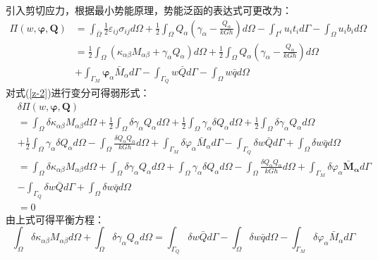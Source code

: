 引入剪切应力，根据最小势能原理，势能泛函的表达式可更改为：
\begin{equation}\label{z-2}
\begin{split} 
    \Pi(w,\boldsymbol{\varphi},\boldsymbol{Q})&=\int_{\bar\Omega}\frac{1}{2}\varepsilon_{ij}\sigma_{ij} d\Omega+\frac{1}{2}\int_{\Omega}Q_{\alpha}(\gamma_{\alpha}-\frac{Q_{\alpha}}{kGh})d\Omega-\int_{\Gamma^{t}} u_{i}t_{i}d\Gamma-\int_{\Omega} u_{i}b_{i}d\Omega\\
    &=\frac{1}{2}\int_{\Omega}(\kappa_{\alpha \beta}M_{\alpha \beta}+\gamma_{\alpha}Q_{\alpha})d\Omega+\frac{1}{2}\int_{\Omega}Q_{\alpha}(\gamma_{\alpha}-\frac{Q_{\alpha}}{kGh})d\Omega\\
    &+\int_{\Gamma_{M}}\pmb\varphi_{\alpha}{\bar{M}_{\alpha}}d\Gamma-\int_{\Gamma_{Q}}{w}\bar {Q}d\Gamma-\int_{\Omega} w\bar{q}d\Omega
\end{split}
\end{equation}
对式(\ref{z-2})进行变分可得弱形式：
\begin{equation} 
    \begin{split}
    &\delta\Pi(w,\boldsymbol\varphi,\boldsymbol{Q})\\
    &=\int_{\Omega}\delta\kappa_{\alpha \beta}M_{\alpha \beta}d\Omega+\frac{1}{2}\int_{\Omega}\delta\gamma_{\alpha}Q_{\alpha}d\Omega+\frac{1}{2}\int_{\Omega}\gamma_{\alpha}\delta{Q}_{\alpha}d\Omega+\frac{1}{2}\int_{\Omega}\delta\gamma_{\alpha}Q_{\alpha}d\Omega\\
    &+\frac{1}{2}\int_{\Omega}\gamma_{\alpha}\delta{Q}_{\alpha}d\Omega-\int_{\Omega}\frac{\delta{Q}_{\alpha}{Q}_{\alpha}}{kGh}d\Omega+\int_{\Gamma_{M}}\delta\varphi_{\alpha}{{\bar M}_{\alpha}}d\Gamma-\int_{\Gamma_{Q}}\delta{w}{\bar Q}d\Gamma+\int_{\Omega} \delta{w}\bar{q}d\Omega\\
    &=\int_{\Omega}\delta\kappa_{\alpha \beta}M_{\alpha \beta}d\Omega+\int_{\Omega}\delta\gamma_{\alpha}Q_{\alpha}d\Omega+\int_{\Omega}\gamma_{\alpha}\delta{Q}_{\alpha}d\Omega-\int_{\Omega}\frac{\delta{Q}_{\alpha}{Q}_{\alpha}}{kGh}d\Omega+\int_{\Gamma_{M}}\delta\varphi_{\alpha}{\boldsymbol{\bar M}_{\boldsymbol{\alpha}}}d\Gamma\\
    &-\int_{\Gamma_{Q}}\delta{w}{\bar Q}d\Gamma+\int_{\Omega} \delta{w}\bar{q}d\Omega\\
    &=0
    \end{split}
\end{equation}
由上式可得平衡方程：
\begin{equation}\label{z-3}
    \int_{\Omega}\delta\kappa_{\alpha \beta}M_{\alpha \beta}d\Omega+\int_{\Omega}\delta\gamma_{\alpha}Q_{\alpha}d\Omega=\int_{\Gamma_{Q}}\delta{w}{\bar Q}d\Gamma-\int_{\Omega} \delta{w}\bar{q}d\Omega-\int_{\Gamma_{M}}\delta\varphi_{\alpha}{{\bar M}_{\alpha}}d\Gamma
\end{equation}
